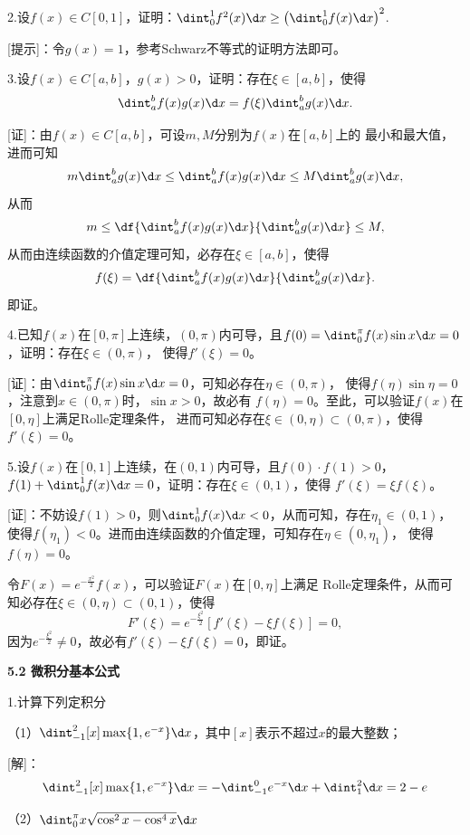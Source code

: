 \bs

2.设$f(x)\in C[0,1]$，证明：$\dint_0^1f^2(x)\d x\geq
\left(\dint_0^1f(x)\d x\right)^2$.

[提示]：令$g(x)=1$，参考Schwarz不等式的证明方法即可。

\bs

3.设$f(x)\in C[a,b]$，$g(x)>0$，证明：存在$\xi\in[a,b]$，使得
$$\dint_a^bf(x)g(x)\d x=f(\xi)\dint_a^bg(x)\d x.$$

[证]：由$f(x)\in C[a,b]$，可设$m,M$分别为$f(x)$在$[a,b]$上的
最小和最大值，进而可知
$$m\dint_a^bg(x)\d x\leq \dint_a^bf(x)g(x)\d x\leq M\dint_a^bg(x)\d x,$$
从而
$$m\leq\df{\dint_a^bf(x)g(x)\d x}{\dint_a^bg(x)\d x}\leq M,$$
从而由连续函数的介值定理可知，必存在$\xi\in[a,b]$，使得
$$f(\xi)=\df{\dint_a^bf(x)g(x)\d x}{\dint_a^bg(x)\d x}.$$
即证。\fin

\bs

4.已知$f(x)$在$[0,\pi]$上连续，$(0,\pi)$内可导，且$f(0)=
\dint_0^{\pi}f(x)\sin x\d x=0$，证明：存在$\xi\in(0,\pi)$，
使得$f'(\xi)=0$。

[证]：由$\dint_0^{\pi}f(x)\sin x\d x=0$，可知必存在$\eta\in(0,\pi)$，
使得$f(\eta)\sin\eta=0$，注意到$x\in(0,\pi)$时，$\sin x>0$，故必有
$f(\eta)=0$。至此，可以验证$f(x)$在$[0,\eta]$上满足Rolle定理条件，
进而可知必存在$\xi\in(0,\eta)\subset (0,\pi)$，使得$f'(\xi)=0$。\fin

5.设$f(x)$在$[0,1]$上连续，在$(0,1)$内可导，且$f(0)\cdot f(1)>0$，
$f(1)+\dint_0^1f(x)\d x=0$，证明：存在$\xi\in(0,1)$，使得
$f'(\xi)=\xi f(\xi)$。

[证]：不妨设$f(1)>0$，则$\dint_0^1f(x)\d x<0$，从而可知，存在$\eta_1\in(0,1)$，
使得$f(\eta_1)<0$。进而由连续函数的介值定理，可知存在$\eta\in(0,\eta_1)$，
使得$f(\eta)=0$。

令$F(x)=e^{-\frac{x^2}2}f(x)$，可以验证$F(x)$在$[0,\eta]$上满足
Rolle定理条件，从而可知必存在$\xi\in(0,\eta)\subset(0,1)$，使得
$$F'(\xi)=e^{-\frac{\xi^2}2}[f'(\xi)-\xi f(\xi)]=0,$$
因为$e^{-\frac{\xi^2}2}\ne0$，故必有$f'(\xi)-\xi f(\xi)=0$，即证。\fin

\begin{center}
	\bf 5.2 微积分基本公式
\end{center}

1.计算下列定积分

（1）$\dint_{-1}^2[x]\max\{1,e^{-x}\}\d x$，其中$[x]$表示不超过$x$的最大整数；

[解]：
$$
	\dint_{-1}^2[x]\max\{1,e^{-x}\}\d x
	=-\dint_{-1}^0e^{-x}\d x+\dint_1^2\d x
	=2-e
$$

（2）$\dint_0^{\pi}x\sqrt{\cos^2x-\cos^4x}\d x$

